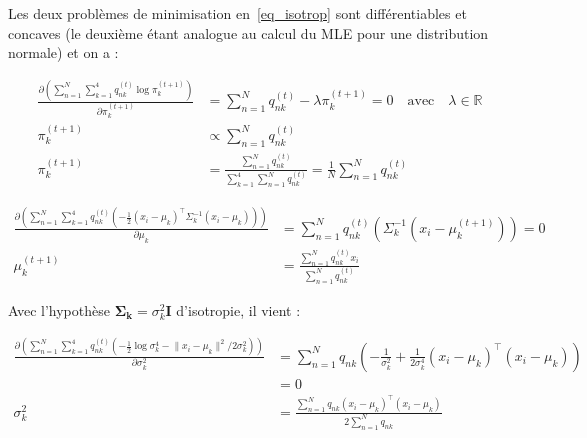 \documentclass[12pt,a4paper,onecolumn]{article}
\begin{document}
Les deux problèmes de minimisation en~\eqref{eq_isotrop} sont différentiables et concaves (le deuxième étant analogue au calcul du MLE pour une distribution normale) et on a :

\begin{equation}
	\begin{split}
		\frac{\partial\left(\sum_{n = 1}^N\sum_{k = 1}^4q_{nk}^{(t)}\log\pi_k^{(t+1)}\right)}{\partial\pi_k^{(t+1)}} &= \sum_{n = 1}^Nq_{nk}^{(t)} - \lambda \pi_k^{(t+1)} = 0 \quad \text{avec} \quad \lambda \in \mathbb{R}\\
		\pi_k^{(t+1)} &\propto \sum_{n = 1}^Nq_{nk}^{(t)}\\
		\pi_k^{(t+1)} &= \frac{\sum_{n = 1}^Nq_{nk}^{(t)}}{\sum_{k = 1}^4\sum_{n = 1}^Nq_{nk}^{(t)}} = \frac{1}{N}\sum_{n = 1}^Nq_{nk}^{(t)}
	\end{split}
\end{equation}


\begin{equation}
	\begin{split}
		\frac{\partial\left(\sum_{n = 1}^N\sum_{k = 1}^4q_{nk}^{(t)}\left(
		-\frac{1}{2}\left(x_i - \mu_k\right)^{\intercal}\Sigma_k^{-1}\left(x_i - \mu_k\right)\right)\right)}{\partial\mu_k} &=
		\sum_{n = 1}^Nq_{nk}^{(t)}\left(\Sigma_k^{-1}(x_i-\mu_k^{(t+1)})\right) = 0\\
		\mu_k^{(t + 1)} &= \frac{\sum_{n = 1}^Nq_{nk}^{(t)}x_i}{\sum_{n = 1}^Nq_{nk}^{(t)}}
	\end{split}
\end{equation}

Avec l'hypothèse \(\bm{\Sigma_k} = \sigma_k^2\bm{I}\) d'isotropie, il vient :


\begin{equation}
	\begin{split}
		\frac{\partial\left(\sum_{n = 1}^N\sum_{k = 1}^4q_{nk}^{(t)}\left(
		-\frac{1}{2}\log\sigma_k^4-\lVert x_i - \mu_k\rVert^2 / 2\sigma_k^2\right)\right)}{\partial\sigma_k^2} &=
		\sum_{n = 1}^Nq_{nk}\left(-\frac{1}{\sigma_k^2} +\frac{1}{2\sigma_k^4}\left(x_i-\mu_k\right)^{\intercal}\left(x_i-\mu_k\right)\right)\\
		&= 0 \\
		\sigma_k^2 &= \frac{\sum_{n = 1}^Nq_{nk}\left(x_i-\mu_k\right)^{\intercal}\left(x_i-\mu_k\right)}{2\sum_{n = 1}^Nq_{nk}}
	\end{split}
\end{equation}
\end{document}
